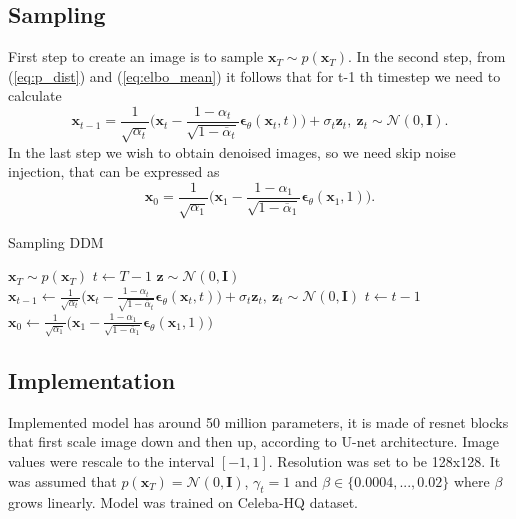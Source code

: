 \documentclass[10pt]{article}
\begin{document}
\subsection{Sampling}
First step to create an image is to sample $\textbf{x}_T \sim p(\textbf{x}_T )$. In the second step,  from (\ref{eq:p_dist}) and
(\ref{eq:elbo_mean}) it follows that for t-1 th timestep we need to calculate
\begin{equation}
    \textbf{x}_{t-1} = \frac{1}{\sqrt{\alpha_t}}\Big(\textbf{x}_t - \frac{1 - \alpha_t}{\sqrt{1 - \overline{\alpha}_t}}\bm{\epsilon}_{\theta}(\textbf{x}_{t}, t) \Big) + \sigma_t \textbf{z}_t, \
    \textbf{z}_t \sim \mathcal{N}(0, \mathbf{I}).
\end{equation}
In the last step we wish to obtain denoised images, so we need skip noise injection, that can be expressed as 
\begin{equation}
    \textbf{x}_{0} = \frac{1}{\sqrt{\alpha_1}}\Big(\textbf{x}_1 - \frac{1 - \alpha_1}{\sqrt{1 - \overline{\alpha}_1}}\bm{\epsilon}_{\theta}(\textbf{x}_{1}, 1) \Big) .
\end{equation}
\begin{algorithm} [H]
\caption{Sampling DDM}\label{alg:cap}
\begin{algorithmic}
    \State $\textbf{x}_T \sim p(\textbf{x}_T)$
    \State $t \gets T-1$
    \State $\textbf{z}\sim \mathcal{N}(0, \mathbf{I})$
    \State $\textbf{x}_{t-1} \gets \frac{1}{\sqrt{\alpha_t}}\Big(\textbf{x}_t - \frac{1 - \alpha_t}{\sqrt{1 - \overline{\alpha}_t}}\bm{\epsilon}_{\theta}(\textbf{x}_{t}, t) \Big) + \sigma_t \textbf{z}_t, \
    \textbf{z}_t \sim \mathcal{N}(0, \mathbf{I})$
    \State $t \gets t-1$
    \EndWhile
    \State $\textbf{x}_{0} \gets \frac{1}{\sqrt{\alpha_1}}\Big(\textbf{x}_1 - \frac{1 - \alpha_1}{\sqrt{1 - \overline{\alpha}_1}}\bm{\epsilon}_{\theta}(\textbf{x}_{1}, 1) \Big)$
\end{algorithmic}
\end{algorithm}
\subsection{Implementation}
Implemented model has around 50 million parameters, it is made of resnet blocks that first scale image down and then up, according to U-net architecture. Image values were rescale to the interval $[-1, 1]$. Resolution was set to be 128x128. It was assumed that $p(\textbf{x}_T) = \mathcal{N}(0, \mathbf{I})$, $\gamma_t = 1$ and $\beta \in \{0.0004, ... , 0.02\}$ where $\beta$ grows linearly. Model was trained on Celeba-HQ \cite{celeba_hq} dataset. 
\end{document}
